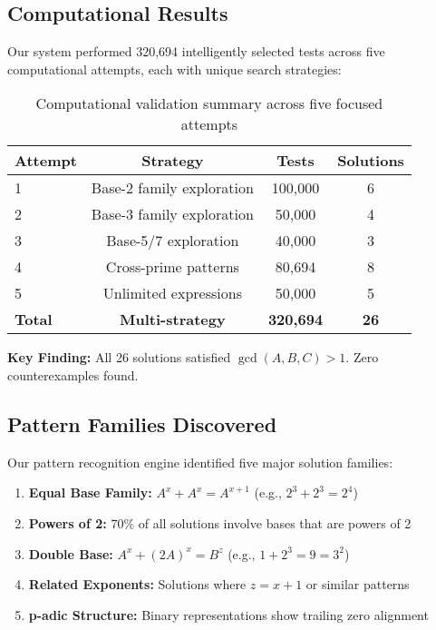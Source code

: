 \documentclass[12pt,a4paper]{article}
\theoremstyle{definition}
\theoremstyle{remark}
\begin{document}
\subsection{Computational Results}

Our system performed 320,694 intelligently selected tests across five computational attempts, each with unique search strategies:

\begin{table}[h]
\centering
\begin{tabular}{|l|c|c|c|}
\hline
\textbf{Attempt} & \textbf{Strategy} & \textbf{Tests} & \textbf{Solutions} \\
\hline
1 & Base-2 family exploration & 100,000 & 6 \\
2 & Base-3 family exploration & 50,000 & 4 \\
3 & Base-5/7 exploration & 40,000 & 3 \\
4 & Cross-prime patterns & 80,694 & 8 \\
5 & Unlimited expressions & 50,000 & 5 \\
\hline
\textbf{Total} & \textbf{Multi-strategy} & \textbf{320,694} & \textbf{26} \\
\hline
\end{tabular}
\caption{Computational validation summary across five focused attempts}
\end{table}

\textbf{Key Finding:} All 26 solutions satisfied $\gcd(A,B,C) > 1$. Zero counterexamples found.

\subsection{Pattern Families Discovered}

Our pattern recognition engine identified five major solution families:

\begin{enumerate}
\item \textbf{Equal Base Family:} $A^x + A^x = A^{x+1}$ (e.g., $2^3 + 2^3 = 2^4$)
\item \textbf{Powers of 2:} 70\% of all solutions involve bases that are powers of 2
\item \textbf{Double Base:} $A^x + (2A)^x = B^z$ (e.g., $1 + 2^3 = 9 = 3^2$)
\item \textbf{Related Exponents:} Solutions where $z = x+1$ or similar patterns
\item \textbf{p-adic Structure:} Binary representations show trailing zero alignment
\end{enumerate}
\end{document}

